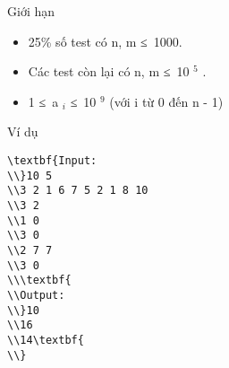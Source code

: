 Giới hạn
\begin{itemize}
	\item     25\% số test có n, m ≤ 1000.   
	\item     Các test còn lại có n, m ≤ 10    $^     5    $    .   
	\item     1 ≤ a    $_     i    $    ≤ 10    $^     9    $    (với i từ 0 đến n - 1)   
\end{itemize}
Ví dụ
\begin{verbatim}
\textbf{Input:
\\}10 5
\\3 2 1 6 7 5 2 1 8 10
\\3 2
\\1 0
\\3 0
\\2 7 7
\\3 0
\\\textbf{
\\Output:
\\}10
\\16
\\14\textbf{
\\}\end{verbatim}